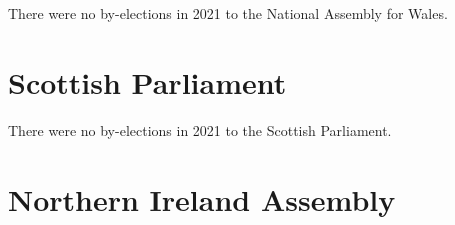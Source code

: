 \documentclass[a4paper,openany]{book}
\begin{document}
There were no by-elections in 2021 to the National Assembly for Wales.


\section{Scottish Parliament}

There were no by-elections in 2021 to the Scottish Parliament.

%
%
%

%
%

\section{Northern Ireland Assembly}
\end{document}
